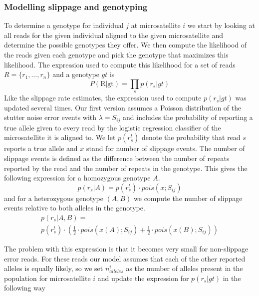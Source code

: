 \documentclass{bioinfo}
\begin{document}
\begin{methods}
\subsubsection{Modelling slippage and genotyping}
\label{subsubsec:modelSlipp}
To determine a genotype for individual $j$ at microsatellite $i$ we start by looking at all reads for the given individual aligned to the given microsatellite and determine the possible genotypes they offer. We then compute the likelihood of the reads given each genotype and pick the genotype that maximizes this likelihood. The expression used to compute this likelihood for a set of reads $R = \{r_1,\dots,r_n\}$ and a genotype $gt$ is 
\begin{equation}
P(\text{R|gt}) = \prod_s p(r_s|gt)
\end{equation}
Like the slippage rate estimates, the expression used to compute $p(r_s|gt)$ was updated several times. Our first version assumes a Poisson distribution of the stutter noise error events with $\lambda = S_{ij}$ and includes the probability of reporting a true allele given to every read by the logistic regression classifier of the microsatellite it is aligned to. We let $p(r^t_s)$ denote the probability that read $s$ reports a true allele and $x$ stand for number of slippage events. The number of slippage events is defined as the difference between the number of repeats reported by the read and the number of repeats in the genotype. This gives the following expression for a homozygous genotype $A$.
\begin{equation}
p(r_s|A) = p(r^t_s) \cdot pois(x;S_{ij})
\label{eq:likelihood}
\end{equation}
and for a heterozygous genotype $(A,B)$ we compute the number of slippage events relative to both alleles in the genotype.
\begin{multline}
p(r_s|A,B) = \\
p(r^t_s) \cdot 
(\frac{1}{2} \cdot pois(x(A);S_{ij})+ \frac{1}{2} \cdot pois(x(B);S_{ij}))
\end{multline}

The problem with this expression is that it becomes very small for non-slippage error reads. For these reads our model assumes that each of the other reported alleles is equally likely, so we set $n^i_{alleles}$ as the number of alleles present in the population for microsatellite $i$ and update the expression for $p(r_s|gt)$ in the following way


\end{methods}
\end{document}
